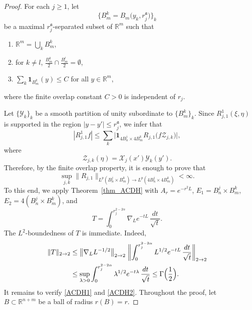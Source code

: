 \documentclass[12pt]{amsart}
\begin{document}
\begin{proof}
For each $j\ge 1$, let
\begin{equation*}
    \bigl\{B_m^k = B_m \bigl(y_k, r_j^{\mathfrak a}\bigr)\bigr\}_k
\end{equation*}
be a maximal $r_j^{\mathfrak a}$-separated subset of $\mathbb{R}^m$ such that
\begin{enumerate}[label=(\roman*)]
    \item $\mathbb{R}^m = \bigcup_k B_m^k$,
    \item for $k\ne l$, $\frac{B_m^k}{2} \cap \frac{B_m^l}{2} = \emptyset$,
    \item $\sum_k \mathbf{1}_{B_m^k}(y)\le C$ for all $y\in \mathbb{R}^m$,
\end{enumerate}
where the finite overlap constant $C>0$ is independent of $r_j$.

Let $\{\mathcal{Y}_k\}_k$ be a smooth partition of unity subordinate to $\{B_m^k\}_k$. Since $R_{j,1}^1(\xi,\eta)$ is supported in the region $|y-y'|\le r_j^{\mathfrak a}$, we infer that
\begin{equation*}
    |R_{j,1}^1f| \le \sum_k \bigl| \mathbf{1}_{4B_n^j \times 4B_m^k} R_{j,1} \bigl( f \mathcal{Z}_{j,k} \bigr) \bigr|,
\end{equation*}
where
\begin{equation*}
    \mathcal{Z}_{j,k}(\eta) = \mathcal{X}_j(x') \mathcal{Y}_k(y').
\end{equation*}
Therefore, by the finite overlap property, it is enough to prove that
\begin{equation*}
    \sup_{j,k} \| R_{j,1} \|_{L^p( B_n^j \times B_m^k ) \to L^p( 4B_n^j \times 4B_m^k )} < \infty.
\end{equation*}
To this end, we apply Theorem~\ref{thm_ACDH} with $A_r = e^{-r^2 L}$, $E_1 = B_n^j \times B_m^k$, $E_2 = 4(B_n^j \times B_m^k)$, and
\begin{equation*}
    T = \int_0^{r_j^{2-2\alpha}} \nabla_L e^{-tL} \, \frac{dt}{\sqrt{t}}.
\end{equation*}
The $L^2$-boundedness of $T$ is immediate. Indeed,
\begin{align*}
    \|T\|_{2\to 2}
    &\le \bigl\| \nabla_L L^{-1/2} \bigr\|_{2\to 2} \; \biggl\| \int_0^{r_j^{2-2\alpha}} L^{1/2} e^{-tL} \, \frac{dt}{\sqrt{t}} \biggr\|_{2\to 2}\\
    &\le \sup_{\lambda >0} \int_0^{r_j^{2-2\alpha}} \lambda^{1/2} e^{-t \lambda} \, \frac{dt}{\sqrt{t}}
    \le \Gamma\Bigl(\frac{1}{2}\Bigr).
\end{align*}
It remains to verify \eqref{ACDH1} and \eqref{ACDH2}. Throughout the proof, let $B\subset \mathbb{R}^{n+m}$ be a ball of radius $r(B)=r$.


\end{proof}
\end{document}
